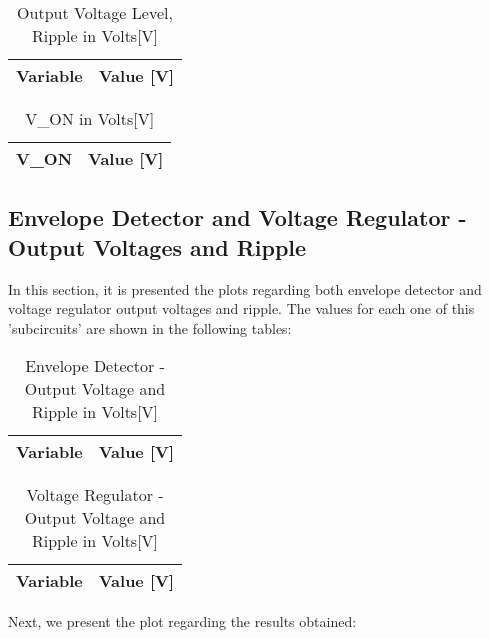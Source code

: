 \begin{table}[H]
  \centering
  \begin{tabular}{|l|r|}
    \hline    
    {\bf Variable} & {\bf Value [V]} \\ \hline
    
  \end{tabular}
  \caption{Output Voltage Level, Ripple in Volts[V]}
  \label{tab:out_voltage}
\end{table}


\begin{table}[H]
  \centering
  \begin{tabular}{|l|r|}
    \hline    
    {\bf V_{ON}} & {\bf Value [V]} \\ \hline
    
  \end{tabular}
  \caption{V_{ON} in Volts[V]}
  \label{tab:v_on}
\end{table}


\newpage
\subsection{Envelope Detector and Voltage Regulator - Output Voltages and Ripple}

\par In this section, it is presented the plots regarding both envelope detector and voltage regulator output voltages and ripple.
The values for each one of this 'subcircuits' are shown in the following tables:

\begin{table}[H]
  \centering
  \begin{tabular}{|l|r|}
    \hline    
    {\bf Variable} & {\bf Value [V]} \\ \hline
    
  \end{tabular}
  \caption{Envelope Detector - Output Voltage and Ripple in Volts[V]}
  \label{tab:out_env}
\end{table}

\begin{table}[H]
  \centering
  \begin{tabular}{|l|r|}
    \hline    
    {\bf Variable} & {\bf Value [V]} \\ \hline
    
  \end{tabular}
  \caption{Voltage Regulator - Output Voltage and Ripple in Volts[V]}
  \label{tab:out_voltage2}
\end{table}


Next, we present the plot regarding the results obtained:

